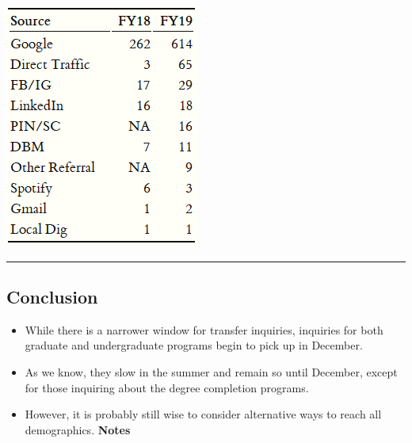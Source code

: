 \documentclass[]{tufte-handout}
\begin{document}
\includegraphics{Capture.PNG}

\begin{center}\rule{0.5\linewidth}{\linethickness}\end{center}

\hypertarget{conclusion}{%
\subsection{Conclusion}\label{conclusion}}

\begin{itemize}
\item
  While there is a narrower window for transfer inquiries, inquiries for
  both graduate and undergraduate programs begin to pick up in December.
\item
  As we know, they slow in the summer and remain so until December,
  except for those inquiring about the degree completion programs.
\item
  However, it is probably still wise to consider alternative ways to
  reach all demographics. \textbf{Notes}
\end{itemize}


\end{document}
